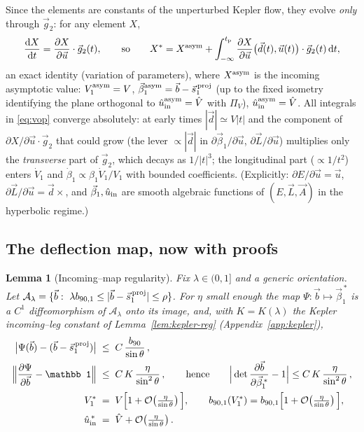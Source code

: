 \documentclass[11pt]{article}
\newcommand{\dd}{\mathrm{d}}
\newcommand{\bv}{\vec b}
\newcommand{\Vh}{\hat V}
\newcommand{\bnt}{b_{90}}
\newcommand{\order}[1]{\mathcal O\!\left(#1\right)}
\newtheorem{lemma}{Lemma}
\begin{document}
Since the elements are constants of the unperturbed Kepler flow, they evolve \emph{only} through
$\vec g_2$: for any element $X$,
\begin{equation}
  \frac{\dd X}{\dd t}=\frac{\partial X}{\partial\vec u}\cdot\vec g_2(t),
  \qquad\text{so}\qquad
  X^*=X^{\rm asym}+\int_{-\infty}^{t_{\rm p}}\frac{\partial X}{\partial\vec u}\big(\vec d(t),\vec u(t)\big)\cdot\vec g_2(t)\,\dd t,
  \label{eq:vop}
\end{equation}
an exact identity (variation of parameters), where $X^{\rm asym}$ is the incoming asymptotic value:
$V_1^{\rm asym}=V$, $\vec\beta_1^{\rm asym}=\bv-\vec s_1^{\,\rm proj}$ (up to the fixed isometry
identifying the plane orthogonal to $\hat u_{\rm in}^{\rm asym}=\Vh$ with $\Pi_V$),
$\hat u_{\rm in}^{\rm asym}=\Vh$. All integrals in \eqref{eq:vop} converge absolutely: at early
times $|\vec d|\simeq V|t|$ and the component of $\partial X/\partial\vec u\cdot\vec g_2$ that could
grow (the lever $\propto|\vec d|$ in $\partial\vec\beta_1/\partial\vec u$, $\partial\vec L/\partial\vec u$)
multiplies only the \emph{transverse} part of $\vec g_2$, which decays as $1/|t|^3$; the
longitudinal part ($\propto1/t^2$) enters $\dot V_1$ and $\dot\beta_1\propto\beta_1\dot V_1/V_1$
with bounded coefficients. (Explicitly: $\partial E/\partial\vec u=\vec u$,
$\partial\vec L/\partial\vec u=\vec d\times$, and $\vec\beta_1,\hat u_{\rm in}$ are smooth algebraic
functions of $(E,\vec L,\vec A)$ in the hyperbolic regime.)

\subsection{The deflection map, now with proofs}

\begin{lemma}[Incoming--map regularity]
\label{lem:map}
Fix $\lambda\in(0,1]$ and a generic orientation. Let
$\mathcal A_\lambda=\{\bv:\ \lambda b_{90,1}\le|\bv-\vec s_1^{\,\rm proj}|\le\rho\}$. For $\eta$
small enough the map $\Psi:\bv\mapsto\vec\beta_1^{\,*}$ is a $C^1$ diffeomorphism of
$\mathcal A_\lambda$ onto its image, and, with $K=K(\lambda)$ the Kepler incoming--leg constant of
Lemma~\ref{lem:kepler-reg} (Appendix~\ref{app:kepler}),
\begin{align}
  \big|\Psi(\bv)-(\bv-\vec s_1^{\,\rm proj})\big|
  &\;\le\;C\,\frac{\bnt}{\sin\theta}\,,
  \label{eq:delta-mag}\\
  \Big\|\frac{\partial\Psi}{\partial\bv}-\mathbb 1\Big\|
  &\;\le\;C\,K\,\frac{\eta}{\sin^2\theta}\,,
  \qquad\text{hence}\qquad
  \Big|\det\frac{\partial\bv}{\partial\vec\beta_1^{\,*}}-1\Big|\le C\,K\,\frac{\eta}{\sin^2\theta}\,,
  \label{eq:jac}\\
  V_1^*&\;=\;V\Big[1+\order{\tfrac{\eta}{\sin\theta}}\Big],\qquad
  b_{90,1}(V_1^*)=b_{90,1}\Big[1+\order{\tfrac{\eta}{\sin\theta}}\Big],
  \label{eq:speed}\\
  \hat u_{\rm in}^{\,*}&\;=\;\Vh+\order{\tfrac{\eta}{\sin\theta}} .
  \label{eq:tilt}
\end{align}
\end{lemma}
\end{document}
